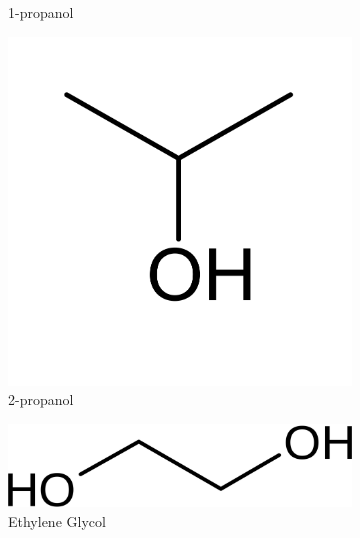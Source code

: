 \begin{figure}[h!]
\begin{subfigure}[b]{0.3\linewidth}
      \caption{1-propanol}
    \end{subfigure}
    \begin{subfigure}[b]{0.3\linewidth}
      \includegraphics[width=\linewidth]{2prop.png}
      \caption{2-propanol}
    \end{subfigure}
    \begin{subfigure}[b]{0.3\linewidth}
        \includegraphics[width=\linewidth]{ethlne.png}
        \caption{Ethylene Glycol}
      \end{subfigure}
      \begin{subfigure}[b]{0.3\linewidth}

\end{subfigure}
\end{figure}

